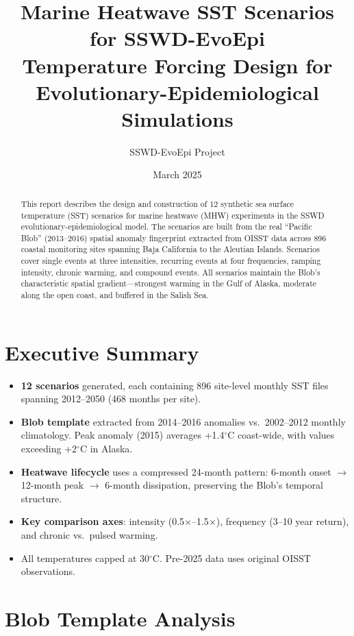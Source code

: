 \documentclass[11pt,a4paper]{article}
\title{\textbf{Marine Heatwave SST Scenarios for SSWD-EvoEpi}\\[0.5em]
\large Temperature Forcing Design for Evolutionary-Epidemiological Simulations}
\author{SSWD-EvoEpi Project}
\date{March 2025}
\begin{document}
\maketitle

\begin{abstract}
This report describes the design and construction of 12 synthetic sea surface temperature (SST) scenarios for marine heatwave (MHW) experiments in the SSWD evolutionary-epidemiological model. The scenarios are built from the real ``Pacific Blob'' (2013--2016) spatial anomaly fingerprint extracted from OISST data across 896 coastal monitoring sites spanning Baja California to the Aleutian Islands. Scenarios cover single events at three intensities, recurring events at four frequencies, ramping intensity, chronic warming, and compound events. All scenarios maintain the Blob's characteristic spatial gradient---strongest warming in the Gulf of Alaska, moderate along the open coast, and buffered in the Salish Sea.
\end{abstract}

\section*{Executive Summary}

\begin{itemize}
    \item \textbf{12 scenarios} generated, each containing 896 site-level monthly SST files spanning 2012--2050 (468 months per site).
    \item \textbf{Blob template} extracted from 2014--2016 anomalies vs.\ 2002--2012 monthly climatology. Peak anomaly (2015) averages +1.4$^\circ$C coast-wide, with values exceeding +2$^\circ$C in Alaska.
    \item \textbf{Heatwave lifecycle} uses a compressed 24-month pattern: 6-month onset $\rightarrow$ 12-month peak $\rightarrow$ 6-month dissipation, preserving the Blob's temporal structure.
    \item \textbf{Key comparison axes}: intensity (0.5$\times$--1.5$\times$), frequency (3--10 year return), and chronic vs.\ pulsed warming.
    \item All temperatures capped at 30$^\circ$C. Pre-2025 data uses original OISST observations.
\end{itemize}

\section{Blob Template Analysis}
\end{document}
